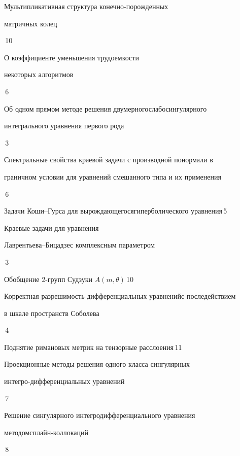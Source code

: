 {Мультипликативная структура конечно-порожденных


матричных колец}{\No\,10}




{О коэффициенте уменьшения трудоемкости


некоторых алгоритмов}{\No\,6}




{Об одном прямом методе решения двумерного\newline слабосингулярного 


интегрального уравнения первого рода}{\No\,3}




{Спектральные свойства краевой задачи с производной по\newline нормали в 


граничном условии для уравнений смешанного типа и их применения}{\No\,6}




{Задачи Коши--Гурса для вырождающегося\newline гиперболического уравнения}{\No\,5}




{Краевые задачи для уравнения 


Лаврентьева--Бицадзе\newline с комплексным параметром}{\No\,3}




{Обобщение 2-групп Судзуки $A(m,\theta)$}{\No\,10}




{Корректная разрешимость дифференциальных уравнений\newline с последействием


в шкале пространств Соболева}{\No\,4}




{Поднятие римановых метрик на тензорные расслоения}{\No\,11}




{Проекционные методы решения одного класса сингулярных


интегро-\newline дифференциальных уравнений}{\No\,7}




{Решение сингулярного интегродифференциального уравнения  


методом\newline сплайн-коллокаций}{\No\,8}


